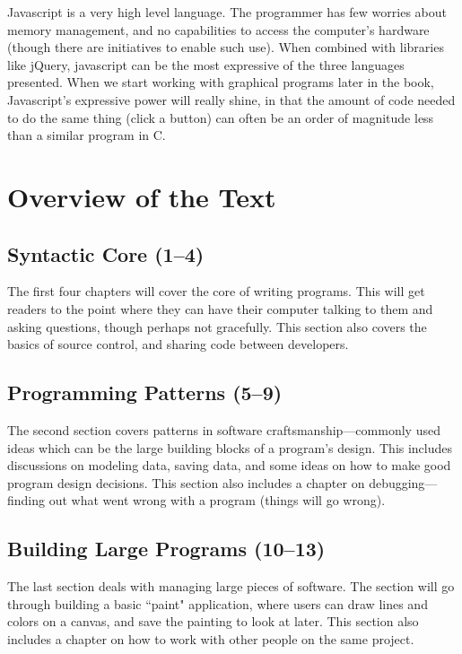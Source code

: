 Javascript is a very high level language. The programmer has few worries about
memory management, and no capabilities to access the computer's hardware
(though there are initiatives to enable such use). When combined with
libraries like jQuery, javascript can be the most expressive of the three
languages presented. When we start working with graphical programs later in
the book, Javascript's expressive power will really shine, in that the amount
of code needed to do the same thing (click a button) can often be an order of
magnitude less than a similar program in C.

\section{Overview of the Text}

\subsection{Syntactic Core (1--4)}

The first four chapters will cover the core of writing programs. This will get
readers to the point where they can have their computer talking to them and
asking questions, though perhaps not gracefully. This section also covers the
basics of source control, and sharing code between developers.

\subsection{Programming Patterns (5--9)}

The second section covers patterns in software craftsmanship---commonly used
ideas which can be the large building blocks of a program's design. This
includes discussions on modeling data, saving data, and some ideas on how to
make good program design decisions. This section also includes a chapter on
debugging---finding out what went wrong with a program (things will go wrong).

\subsection{Building Large Programs (10--13)}

The last section deals with managing large pieces of software. The section
will go through building a basic ``paint" application, where users can draw
lines and colors on a canvas, and save the painting to look at later. This
section also includes a chapter on how to work with other people on the same
project.

